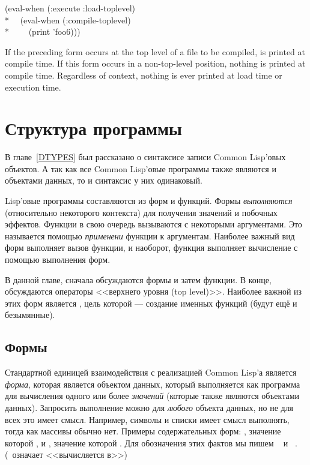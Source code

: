 \begin{defspec}
\begin{lisp}
(eval-when (:execute :load-toplevel) \\*
~~(eval-when (:compile-toplevel) \\*
~~~~(print 'foo6)))
\end{lisp}

    If the preceding form occurs at the top level of a file to be compiled,
        is
       printed at compile time.  If this form occurs in a non-top-level
       position, nothing is printed at compile time. Regardless of context,
       nothing is ever printed at load time or execution time.
\end{defspec}

\else

\chapter{Структура программы}
\label{PROGS}

В главе~\ref{DTYPES} был рассказано о синтаксисе записи Common Lisp'овых объектов.
А так как все Common Lisp'овые программы также являются и объектами данных, то и
синтаксис у них одинаковый.

Lisp'овые программы составляются из форм и функций. Формы \emph{выполняются}
(относительно некоторого контекста) для получения значений и побочных
эффектов. Функции в свою очередь вызываются с некоторыми аргументами. Это
называется помощью \emph{применени} функции к аргументам. 
Наиболее важный вид форм выполняет вызов функции, и наоборот, функция выполняет
вычисление с помощью выполнения форм.

В данной главе, сначала обсуждаются формы и затем функции. В конце, обсуждаются
операторы <<верхнего уровня (top level)>>. Наиболее важной из этих форм
является , цель которой --- создание именных функций (будут
ещё и безымянные).

\section{Формы}

Стандартной единицей взаимодействия с реализацией Common Lisp'а является
\emph{форма}, которая является объектом данных, который выполняется как
программа для вычисления одного или более \emph{значений} (которые также
являются объектами данных). Запросить выполнение можно для \emph{любого}
объекта данных, но не для всех это имеет смысл. Например, символы и списки имеет
смысл выполнять, тогда как массивы обычно нет. Примеры содержательных форм:
, значение которой , и , значение которой .
Для обозначения этих фактов мы пишем  \EV\  и  \EV\
. (\EV\ означает <<вычисляется в>>)

